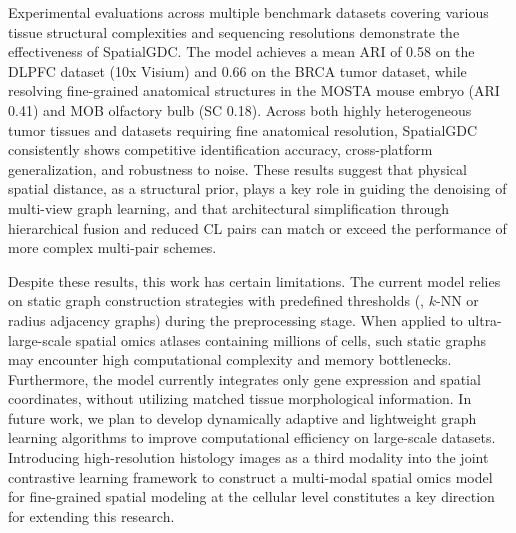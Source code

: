 \documentclass[lettersize,journal]{IEEEtran}
\begin{document}
Experimental evaluations across multiple benchmark datasets covering various tissue structural complexities and sequencing resolutions demonstrate the effectiveness of SpatialGDC. The model achieves a mean ARI of 0.58 on the DLPFC dataset (10x Visium) and 0.66 on the BRCA tumor dataset, while resolving fine-grained anatomical structures in the MOSTA mouse embryo (ARI 0.41) and MOB olfactory bulb (SC 0.18). Across both highly heterogeneous tumor tissues and datasets requiring fine anatomical resolution, SpatialGDC consistently shows competitive identification accuracy, cross-platform generalization, and robustness to noise. These results suggest that physical spatial distance, as a structural prior, plays a key role in guiding the denoising of multi-view graph learning, and that architectural simplification through hierarchical fusion and reduced CL pairs can match or exceed the performance of more complex multi-pair schemes.

Despite these results, this work has certain limitations. The current model relies on static graph construction strategies with predefined thresholds (\eg, $k$-NN or radius adjacency graphs) during the preprocessing stage. When applied to ultra-large-scale spatial omics atlases containing millions of cells, such static graphs may encounter high computational complexity and memory bottlenecks. Furthermore, the model currently integrates only gene expression and spatial coordinates, without utilizing matched tissue morphological information. In future work, we plan to develop dynamically adaptive and lightweight graph learning algorithms to improve computational efficiency on large-scale datasets. Introducing high-resolution histology images as a third modality into the joint contrastive learning framework to construct a multi-modal spatial omics model for fine-grained spatial modeling at the cellular level constitutes a key direction for extending this research.



\end{document}
